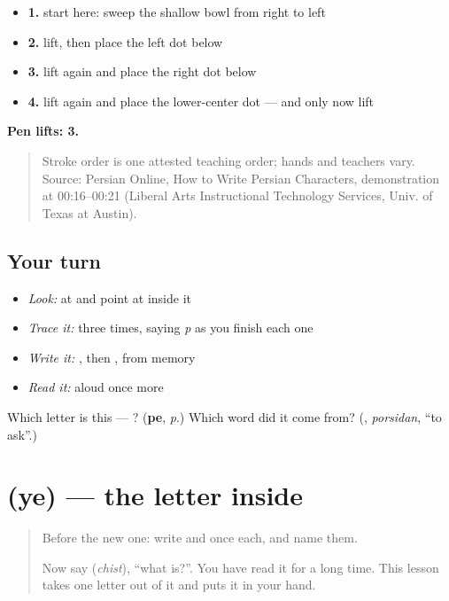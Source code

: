 \begin{itemize}
\raggedright
  \item \textbf{1.} start here: sweep the shallow bowl from right to left
  \item \textbf{2.} lift, then place the left dot below
  \item \textbf{3.} lift again and place the right dot below
  \item \textbf{4.} lift again and place the lower-center dot — and only now lift
\end{itemize}

\textbf{Pen lifts: 3.}

\begin{quote}
Stroke order is one attested teaching order; hands and teachers vary. Source: Persian Online, How to Write Persian Characters,  demonstration at 00:16–00:21 (Liberal Arts Instructional Technology Services, Univ. of Texas at Austin).
\end{quote}

\subsection*{Your turn}
\begin{itemize}
\raggedright
  \item \emph{Look:} at \textbf{} and point at  inside it
  \item \emph{Trace it:}  three times, saying \emph{p} as you finish each one
  \item \emph{Write it:} , then , from memory
  \item \emph{Read it:} \textbf{} aloud once more
\end{itemize}

\begin{tcolorbox}[breakable,colback=teal!4,colframe=teal!35!black,title={Before you move on}]
Which letter is this — ? (\textbf{pe}, \emph{p}.) Which word did it come from? (\textbf{}, \emph{porsidan}, \textquotedblleft{}to ask\textquotedblright{}.)
\end{tcolorbox}
\section[\texorpdfstring{\fa{ی} (ye)}{ی (ye)}]{ (ye) — the letter inside }

\label{lesson:FA-W24-ye}



\begin{quote}
Before the new one: write  and  once each, and name them.

Now say \textbf{} (\emph{chist}), \textquotedblleft{}what is?\textquotedblright{}. You have read it for a long time. This lesson takes one letter out of it and puts it in your hand.
\end{quote}

